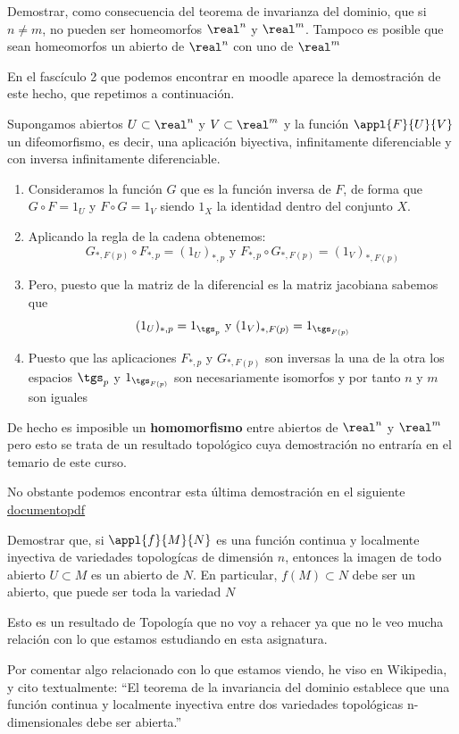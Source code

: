 \begin{problem}[6]
Demostrar, como consecuencia del teorema de invarianza del dominio, que si $n \neq m$, no pueden ser homeomorfos $\real^n$ y $\real^m$. Tampoco es posible que sean homeomorfos un abierto de $\real^n$ con uno de $\real^m$
\solution


En el fascículo 2 que podemos encontrar en moodle aparece la demostración de este hecho, que repetimos a continuación.

Supongamos abiertos $U \subset \real^n$ y $V\subset \real^m$ y la función $\appl{F}{U}{V}$ un difeomorfismo, es decir, una aplicación biyectiva, infinitamente diferenciable y con inversa infinitamente diferenciable.

\begin{enumerate}
\item Consideramos la función $G$ que es la función inversa de $F$, de forma que $G \circ F = 1_U$ y $F \circ G = 1_V$ siendo $1_X$ la identidad dentro del conjunto $X$.

\item Aplicando la regla de la cadena obtenemos:
\[G_{*,F(p)}\circ F_{*,p} = (1_U)_{*,p} \text{ y }  F_{*,p} \circ G_{*,F(p)} = (1_V)_{*,F(p)}\]

\item Pero, puesto que la matriz de la diferencial es la matriz jacobiana sabemos que
\[(1_U)_{*,p} = 1_{\tgs_p} \text{ y } (1_V)_{*,F(p)} = 1_{\tgs_{F(p)}}\]

\item Puesto que las aplicaciones $F_{*,p}$ y $G_{*,F(p)}$ son inversas la una de la otra los espacios $\tgs_p$ y $ 1_{\tgs_{F(p)}}$ son necesariamente isomorfos y por tanto $n$ y $m$ son iguales
\end{enumerate}

De hecho es imposible un \textbf{homomorfismo} entre abiertos de $\real^n$ y $\real^m$ pero esto se trata de un resultado topológico cuya demostración no entraría en el temario de este curso.

No obstante podemos encontrar esta última demostración en el siguiente \href{http://www.cmat.edu.uy/~rpotrie/documentos/pdfs/invarianciadimension.pdf}{documentopdf}
\end{problem}

\begin{problem}[7]
Demostrar que, si $\appl{f}{M}{N}$ es una función continua y localmente inyectiva de variedades topologícas de dimensión $n$, entonces la imagen de todo abierto $U \subset M$ es un abierto de $N$. En particular, $f(M)\subset N$ debe ser un abierto, que puede ser toda la variedad $N$
\solution


Esto es un resultado de Topología que no voy a rehacer ya que no le veo mucha relación con lo que estamos estudiando en esta asignatura.

Por comentar algo relacionado con lo que estamos viendo, he viso en Wikipedia, y cito textualmente: ``El teorema de la invariancia del dominio establece que una función continua y localmente inyectiva entre dos variedades topológicas n-dimensionales debe ser abierta.''
\end{problem}

